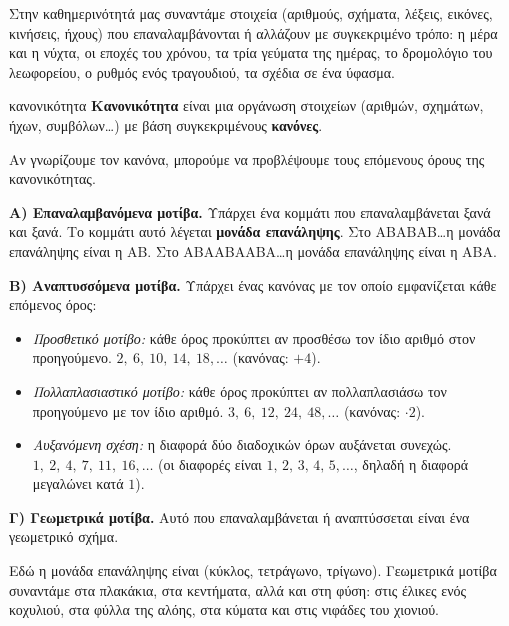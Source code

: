 

Στην καθημερινότητά μας συναντάμε στοιχεία (αριθμούς, σχήματα, λέξεις, εικόνες, κινήσεις, ήχους) που επαναλαμβάνονται ή αλλάζουν με συγκεκριμένο τρόπο: η μέρα και η νύχτα, οι εποχές του χρόνου, τα τρία γεύματα της ημέρας, το δρομολόγιο του λεωφορείου, ο ρυθμός ενός τραγουδιού, τα σχέδια σε ένα ύφασμα.

\begin{orismos}{κανονικότητα}
\textbf{Κανονικότητα} είναι μια οργάνωση στοιχείων (αριθμών, σχημάτων, ήχων, συμβόλων\ldots) με βάση συγκεκριμένους \textbf{κανόνες}.
\end{orismos}

Αν γνωρίζουμε τον κανόνα, μπορούμε να προβλέψουμε τους επόμενους όρους της κανονικότητας.


\textbf{Α) Επαναλαμβανόμενα μοτίβα.} Υπάρχει ένα κομμάτι που επαναλαμβάνεται ξανά και ξανά. Το κομμάτι αυτό λέγεται \textbf{μονάδα επανάληψης}. Στο ΑΒΑΒΑΒ\ldots η μονάδα επανάληψης είναι η ΑΒ. Στο ΑΒΑΑΒΑΑΒΑ\ldots η μονάδα επανάληψης είναι η ΑΒΑ.

\textbf{Β) Αναπτυσσόμενα μοτίβα.} Υπάρχει ένας κανόνας με τον οποίο εμφανίζεται κάθε επόμενος όρος:
\begin{itemize}[leftmargin=1.2em,itemsep=0.3ex,topsep=2pt]
\item \emph{Προσθετικό μοτίβο:} κάθε όρος προκύπτει αν προσθέσω τον ίδιο αριθμό στον προηγούμενο. $2,\ 6,\ 10,\ 14,\ 18,\dots$ (κανόνας: $+4$).
\item \emph{Πολλαπλασιαστικό μοτίβο:} κάθε όρος προκύπτει αν πολλαπλασιάσω τον προηγούμενο με τον ίδιο αριθμό. $3,\ 6,\ 12,\ 24,\ 48,\dots$ (κανόνας: $\cdot2$).
\item \emph{Αυξανόμενη σχέση:} η διαφορά δύο διαδοχικών όρων αυξάνεται συνεχώς. $1,\ 2,\ 4,\ 7,\ 11,\ 16,\dots$ (οι διαφορές είναι $1,\,2,\,3,\,4,\,5,\dots$, δηλαδή η διαφορά μεγαλώνει κατά $1$).
\end{itemize}

\textbf{Γ) Γεωμετρικά μοτίβα.} Αυτό που επαναλαμβάνεται ή αναπτύσσεται είναι ένα γεωμετρικό σχήμα.

\begin{center}
\end{center}

Εδώ η μονάδα επανάληψης είναι (κύκλος, τετράγωνο, τρίγωνο). Γεωμετρικά μοτίβα συναντάμε στα πλακάκια, στα κεντήματα, αλλά και στη φύση: στις έλικες ενός κοχυλιού, στα φύλλα της αλόης, στα κύματα και στις νιφάδες του χιονιού.

